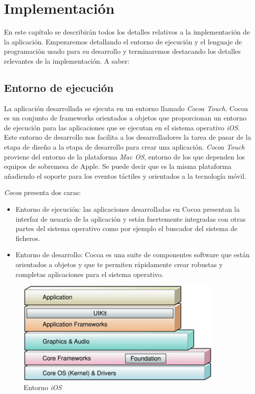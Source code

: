 \chapter{Implementación}
\label{ch:implemetacion}
 En este capítulo se describirán todos los detalles relativos a la implementación de la aplicación. Empezaremos detallando el entorno de ejecución y el lenguaje de programación usado para su desarrollo y terminaremos destacando los detalles relevantes de la implementación. A saber:
 
\section{Entorno de ejecución}
 La aplicación desarrollada se ejecuta en un entorno llamado \emph{Cocoa Touch}. Cocoa es un conjunto de frameworks orientados a objetos que proporcionan un entorno de ejecución para las aplicaciones que se ejecutan en el sistema operativo \emph{iOS}. Este entorno de desarrollo nos facilita a los desarrolladores la tarea de pasar de la etapa de diseño a la etapa de desarrollo para crear una aplicación. \emph{Cocoa Touch} proviene del entorno de la plataforma \emph{Mac OS}, entorno de los que dependen los equipos de sobremesa de Apple. Se puede decir que es la misma plataforma añadiendo el soporte para los eventos táctiles y orientados a la tecnología móvil. 
 
 \emph{Cocoa} presenta dos caras: 
 \begin{itemize}
	\item Entorno de ejecución: las aplicaciones desarrolladas en Cocoa presentan la interfaz de usuario de la aplicación y están fuertemente integradas con otras partes del sistema operativo como por ejemplo el buscador del sistema de ficheros.
	\item Entorno de desarrollo: Cocoa es una suite de componentes software que están orientados a objetos y que te permiten rápidamente crear robustas y completas aplicaciones para el sistema operativo.
\end{itemize}
  
 \begin{figure}[ht!]
    \centering
       \includegraphics[width=0.9\textwidth]{./images/architecture_stack.jpg}
     \caption{Entorno \emph{iOS}}
   \label{fig:iOS Platform}
\end{figure}
 
